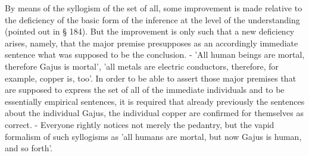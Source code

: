 By means of the syllogism of the set of all, some improvement is made
relative to the deficiency of the basic form of the inference at the level
of the understanding (pointed out in § 184). But the improvement is
only such that a new deficiency arises, namely, that the major premise
presupposes as an accordingly immediate sentence what was supposed to
be the conclusion. - 'All human beings are mortal, therefore Gajus is mortal',
'all metals are electric conductors, therefore, for example, copper is, too'. In
order to be able to assert those major premises that are supposed to express
the set of all of the immediate individuals and to be essentially empirical
sentences, it is required that already previously the sentences about the
individual Gajus, the individual copper are confirmed for themselves as
correct. - Everyone rightly notices not merely the pedantry, but the vapid
formalism of such syllogisms as 'all humans are mortal, but
now Gajus is human, and so forth'.

